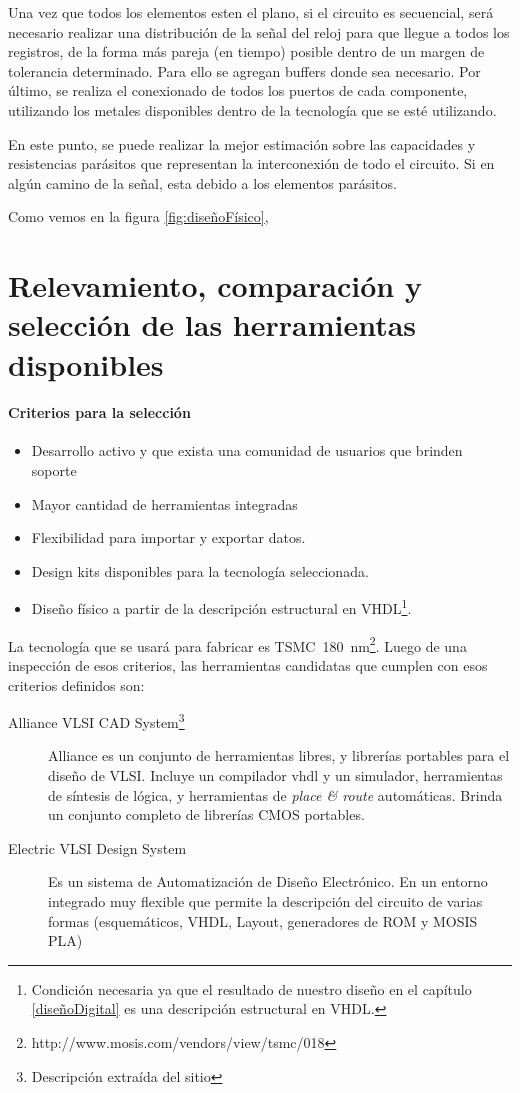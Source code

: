 Una vez que todos los elementos esten el plano, si el circuito es secuencial, será necesario realizar una distribución de la señal del reloj para que llegue a todos los registros, de la forma más pareja (en tiempo) posible dentro de un margen de tolerancia determinado. Para ello se agregan buffers donde sea necesario. Por último, se realiza el conexionado de todos los puertos de cada componente, utilizando los metales disponibles dentro de la tecnología que se esté utilizando.

En este punto, se puede realizar la mejor estimación sobre las capacidades y resistencias parásitos que representan la interconexión de todo el circuito. Si en algún camino de la señal, esta debido a los elementos parásitos. 

Como vemos en la figura \ref{fig:diseñoFísico}, 


\section{Relevamiento, comparación y selección de las herramientas disponibles}
\paragraph{Criterios para la selección}
\begin{itemize}
\item Desarrollo activo y que exista una comunidad de usuarios que brinden soporte
\item Mayor cantidad de herramientas integradas
\item Flexibilidad para importar y exportar datos. 
\item Design kits disponibles para la tecnología seleccionada.
\item Diseño físico a partir de la descripción estructural en VHDL\footnote{Condición necesaria ya que el resultado de nuestro diseño en el capítulo \ref{diseñoDigital} es una descripción estructural en VHDL.}.
\end{itemize}

La tecnología que se usará para fabricar es TSMC~180~nm\footnote{http://www.mosis.com/vendors/view/tsmc/018}.
Luego de una inspección de esos criterios, las herramientas candidatas que cumplen con esos criterios definidos son:

\begin{description}
\item[Alliance VLSI CAD System\footnote{Descripción extraída del sitio}]Alliance es un conjunto de herramientas libres, y librerías portables para el diseño de VLSI. Incluye un compilador vhdl y un simulador, herramientas de síntesis de lógica, y herramientas de \emph{place \& route} automáticas. Brinda un conjunto completo de librerías CMOS portables.

\item[Electric VLSI Design System] Es un sistema de Automatización de Diseño Electrónico. En un entorno integrado muy flexible que permite la descripción del circuito de varias formas (esquemáticos, VHDL, Layout, generadores de ROM y MOSIS PLA)   

\end{description}


